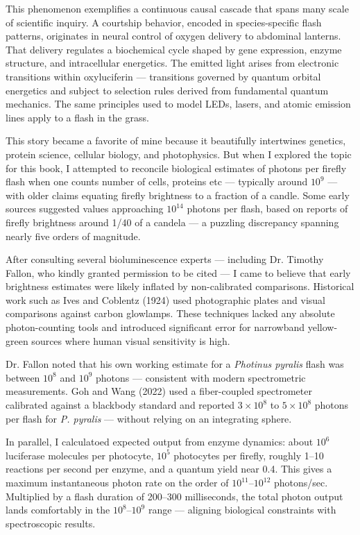 This phenomenon exemplifies a continuous causal cascade that spans many scale of scientific inquiry. A courtship behavior, encoded in species-specific flash patterns, originates in neural control of oxygen delivery to abdominal lanterns. That delivery regulates a biochemical cycle shaped by gene expression, enzyme structure, and intracellular energetics. The emitted light arises from electronic transitions within oxyluciferin — transitions governed by quantum orbital energetics and subject to selection rules derived from fundamental quantum mechanics. The same principles used to model LEDs, lasers, and atomic emission lines apply to a flash in the grass.


\begin{commentary}
This story became a favorite of mine because it beautifully intertwines genetics, protein science, cellular biology, and photophysics. But when I explored the topic for this book, I attempted to reconcile biological estimates of photons per firefly flash when one counts number of cells, proteins etc — typically around $10^9$ — with older claims equating firefly brightness to a fraction of a candle. Some early sources suggested values approaching $10^{14}$ photons per flash, based on reports of firefly brightness around 1/40 of a candela — a puzzling discrepancy spanning nearly five orders of magnitude.

After consulting several bioluminescence experts — including Dr. Timothy Fallon, who kindly granted permission to be cited — I came to believe that early brightness estimates were likely inflated by non-calibrated comparisons. Historical work such as Ives and Coblentz (1924) used photographic plates and visual comparisons against carbon glowlamps. These techniques lacked any absolute photon-counting tools and introduced significant error for narrowband yellow-green sources where human visual sensitivity is high.

Dr. Fallon noted that his own working estimate for a \textit{Photinus pyralis} flash was between $10^8$ and $10^9$ photons — consistent with modern spectrometric measurements. Goh and Wang (2022) used a fiber-coupled spectrometer calibrated against a blackbody standard and reported $3 \times 10^8$ to $5 \times 10^8$ photons per flash for \textit{P. pyralis} — without relying on an integrating sphere.

In parallel, I calculatoed expected output from enzyme dynamics: about $10^6$ luciferase molecules per photocyte, $10^5$ photocytes per firefly, roughly 1–10 reactions per second per enzyme, and a quantum yield near 0.4. This gives a maximum instantaneous photon rate on the order of $10^{11}$–$10^{12}$ photons/sec. Multiplied by a flash duration of 200–300 milliseconds, the total photon output lands comfortably in the $10^8$–$10^9$ range — aligning biological constraints with spectroscopic results.


\end{commentary}
